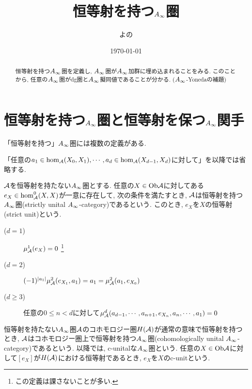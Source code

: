 \documentclass[uplatex, a4paper, 14Q, dvipdfmx]{jsarticle}
\title{恒等射を持つ\texorpdfstring{$A_{\infty}$}{Ainf}圏}
\author{よの}
\date{\today}
\begin{document}
\maketitle

\begin{abstract}
  恒等射を持つ$A_{\infty}$圏を定義し, $A_{\infty}$圏が$A_{\infty}$加群に埋め込まれることをみる. 
  このことから, 任意の$A_{\infty}$圏がdg圏と$A_{\infty}$擬同値であることが分かる. ($A_{\infty}$-Yonedaの補題)
\end{abstract}

\tableofcontents

\section{恒等射を持つ\texorpdfstring{$A_{\infty}$}{Ainf}圏と恒等射を保つ\texorpdfstring{$A_{\infty}$}{Ainf}関手}

「恒等射を持つ」$A_{\infty}$圏には複数の定義がある.

「任意の$a_1 \in \hom_{\mathcal{A}}(X_0,X_1), \cdots, a_d \in \hom_{\mathcal{A}}(X_{d-1},X_d)$に対して」を以降では省略する. 

\begin{definition}
  $\mathcal{A}$を恒等射を持たない$A_{\infty}$圏とする. 
  任意の$X \in \mathrm{Ob}\mathcal{A}$に対してある$e_X \in \hom_{\mathcal{A}}^0(X,X)$が一意に存在して, 次の条件を満たすとき, $\mathcal{A}$は恒等射を持つ$A_{\infty}$圏(strictly unital $A_{\infty}$-category)であるという. 
  このとき, $e_X$を$X$の恒等射(strict unit)という.
  \begin{description}
    \item[($d=1$)] $\mu^1_{\mathcal{A}}(e_X) = 0$ 
    \footnote{
      この定義は課さないことが多い.
    }
    \item[($d=2$)] $(-1)^{|a_1|} \mu^2_{\mathcal{A}}(e_{X_1},a_1) = a_1 = \mu^2_{\mathcal{A}}(a_1,e_{X_0})$
    \item[($d \geq 3$)] 任意の$0 \leq n < d$に対して$\mu^d_{\mathcal{A}}(a_{d-1},\cdots,a_{n+1},e_{X_n},a_n,\cdots,a_1) = 0$
  \end{description}
\end{definition}

\begin{definition}
  恒等射を持たない$A_{\infty}$圏$\mathcal{A}$のコホモロジー圏$H(\mathcal{A})$が通常の意味で恒等射を持つとき, $\mathcal{A}$はコホモロジー圏上で恒等射を持つ$A_{\infty}$圏(cohomologically unital $A_{\infty}$-category)であるという. 
  以降では, c-unitalな$A_{\infty}$圏という. 
  任意の$X \in \mathrm{Ob}\mathcal{A}$に対して$[e_X]$が$H(\mathcal{A})$における恒等射であるとき, $e_X$を$X$のc-unitという.
\end{definition}
\end{document}
